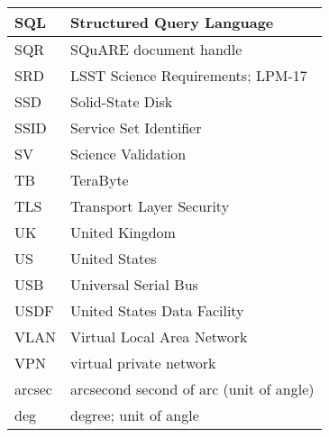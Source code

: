 \begin{longtable}{p{}p{}}
SQL & Structured Query Language \\\hline
SQR & SQuARE document handle \\\hline
SRD & LSST Science Requirements; LPM-17 \\\hline
SSD & Solid-State Disk \\\hline
SSID & Service Set Identifier \\\hline
SV & Science Validation \\\hline
TB & TeraByte \\\hline
TLS & Transport Layer Security \\\hline
UK & United Kingdom \\\hline
US & United States \\\hline
USB & Universal Serial Bus \\\hline
USDF & United States Data Facility \\\hline
VLAN &  Virtual Local Area Network \\\hline
VPN & virtual private network \\\hline
arcsec & arcsecond second of arc (unit of angle) \\\hline
deg & degree; unit of angle \\\hline
\end{longtable}
